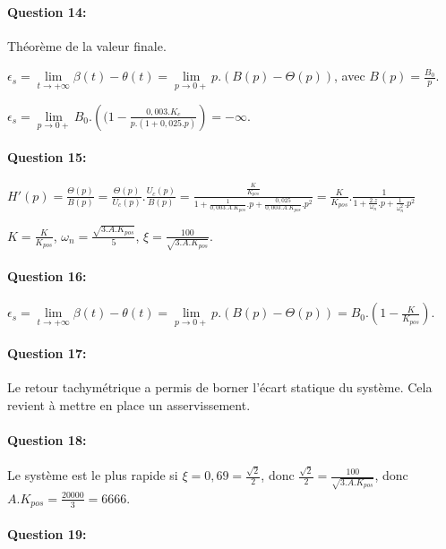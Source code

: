 \paragraph{Question 14:}

Théorème de la valeur finale.

$\epsilon_s=\lim\limits_{t \rightarrow +\infty} \beta(t)-\theta(t)=\lim\limits_{p \rightarrow 0+} p.(B(p)-\Theta(p))$, avec $B(p)=\frac{B_0}{p}$.

$\epsilon_s=\lim\limits_{p \rightarrow 0+} B_0.\left((1-\frac{0,003.K_c}{p.(1+0,025.p)}\right)=-\infty$.

\paragraph{Question 15:}
	
$H'(p)=\frac{\Theta(p)}{B(p)}=\frac{\Theta(p)}{U_c(p)}.\frac{U_c(p)}{B(p)}=\frac{\frac{K}{K_{pos}}}{1+\frac{1}{0,003.A.K_{pos}}.p+\frac{0,025}{0,003.A.K_{pos}}.p^2}=\frac{K}{K_{pos}}.\frac{1}{1+\frac{2.z}{\omega_n}.p+\frac{1}{\omega_n^2}.p^2}$

$K=\frac{K}{K_{pos}}$, $\omega_n=\frac{\sqrt{3.A.K_{pos}}}{5}$, $\xi=\frac{100}{\sqrt{3.A.K_{pos}}}$.

\paragraph{Question 16:}

$\epsilon_s=\lim\limits_{t \rightarrow +\infty} \beta(t)-\theta(t)=\lim\limits_{p \rightarrow 0+} p.(B(p)-\Theta(p))=B_0.\left(1-\frac{K}{K_{pos}}\right)$.


\paragraph{Question 17:}

Le retour tachymétrique a permis de borner l'écart statique du système. Cela revient à mettre en place un asservissement.

\paragraph{Question 18:}

Le système est le plus rapide si $\xi=0,69=\frac{\sqrt{2}}{2}$, donc $\frac{\sqrt{2}}{2}=\frac{100}{\sqrt{3.A.K_{pos}}}$, donc $A.K_{pos}=\frac{20000}{3}=6666$.

\paragraph{Question 19:}

